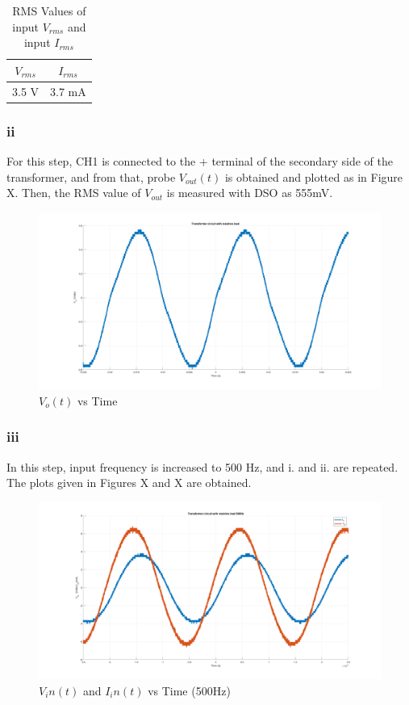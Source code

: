 \documentclass[letterpaper,12pt]{article}
\begin{document}
\begin{table}[H]
    \begin{center}
        \caption{RMS Values of input \(V_{rms}\) and input \(I_{rms}\)}
        \vspace{2mm}
        \begin{tabular}{||c | c ||} 
            \hline
            \(V_{rms}\) & \(I_{rms}\) \\ [0.5ex] 
            \hline\hline
            3.5 V & 3.7 mA    \\
            \hline
        \end{tabular}
    \end{center}
\end{table}

\subsubsection{ii}
For this step, CH1 is connected to the + terminal of the secondary side of the transformer, and from that, probe \(V_{out}(t)\) is obtained and plotted as in Figure X. Then, the RMS value of \(V_{out}\) is measured with DSO as 555mV.
\begin{figure}[H]
    \centering
    \includegraphics[width = 1\textwidth]{2_2.png}
    \caption{\(V_o(t) \) vs Time}
\end{figure} 

\subsubsection{iii}
In this step, input frequency is increased to 500 Hz, and i. and ii. are repeated. The plots given in Figures X and X are obtained.
\begin{figure}[H]
    \centering
    \includegraphics[width = 1\textwidth]{2_3_1.png}
    \caption{\(V_in(t) \) and \(I_in(t)\) vs Time (500Hz)}
\end{figure} 
\end{document}
